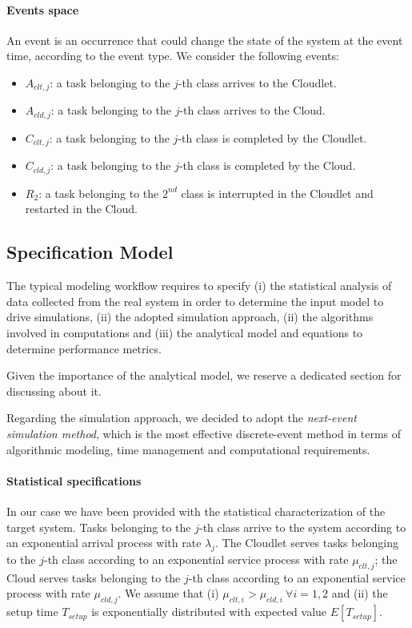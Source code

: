 \paragraph{Events space}
An event is an occurrence that could change the state of the system at the event time, according to the event type.
We consider the following events:

\begin{itemize}
	\item $A_{clt,j}$: a task belonging to the $j$-th class arrives to the Cloudlet.
	
	\item $A_{cld,j}$: a task belonging to the $j$-th class arrives to the Cloud.

	\item $C_{clt,j}$: a task belonging to the $j$-th class is completed by the Cloudlet.
	
	\item $C_{cld,j}$: a task belonging to the $j$-th class is completed by the Cloud.
	
	\item $R_{2}$: a task belonging to the $2^{nd}$ class is interrupted in the Cloudlet and restarted in the Cloud.
\end{itemize}

\subsection{Specification Model}
The typical modeling workflow requires to specify
(i) the statistical analysis of data collected from the real system in order to determine the input model to drive simulations,
(ii) the adopted simulation approach,
(ii) the algorithms involved in computations and
(iii) the analytical model and equations to determine performance metrics.

Given the importance of the analytical model, we reserve a dedicated section for discussing about it.

Regarding the simulation approach, we decided to adopt the \textit{next-event simulation method}, which is the most effective discrete-event method in terms of algorithmic modeling, time management and computational requirements.

\paragraph{Statistical specifications}
In our case we have been provided with the statistical characterization of the target system.
Tasks belonging to the $j$-th class arrive to the system according to an exponential arrival process with rate $ \lambda_{j}$.
The Cloudlet serves tasks belonging to the $j$-th class according to an exponential service process with rate $\mu_{clt,j}$; the Cloud serves tasks belonging to the $j$-th class according to an exponential service process with rate $\mu_{cld,j}$.
We assume that 
(i) $\mu_{clt,i}>\mu_{cld,i}\ \forall i=1,2$ and
(ii) the setup time $T_{setup}$ is exponentially distributed with expected value $E[T_{setup}]$.

